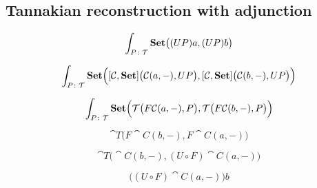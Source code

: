 \documentclass[DaoFP]{subfiles}
\begin{document}
\subsection{Tannakian reconstruction with adjunction}



\[ \int_{P \colon \mathcal{T}} \mathbf{Set} \big((U P) a, (U P) b\big) \]

\[ \int_{P \colon \mathcal{T}} \mathbf{Set} \Big([\mathcal{C}, \mathbf{Set}] \big( \mathcal{C} (a ,-), U P\big), [\mathcal{C}, \mathbf{Set}] \big( \mathcal{C} (b ,-), U P\big)\Big) \]

\[ \int_{P \colon \mathcal{T}} \mathbf{Set} \Big(\mathcal{T} \big( F \mathcal{C} (a ,-), P\big), \mathcal{T} \big( F \mathcal{C} (b ,-), P\big)\Big) \]

\[ \cat T\big( F \cat C (b ,-), F \cat C (a ,-) \big) \]

\[ \cat T\big( \cat C (b ,-), (U\circ F) \cat C (a ,-) \big) \]

\[ \big( (U\circ F) \cat C (a ,-) \big) b \]
\end{document}
